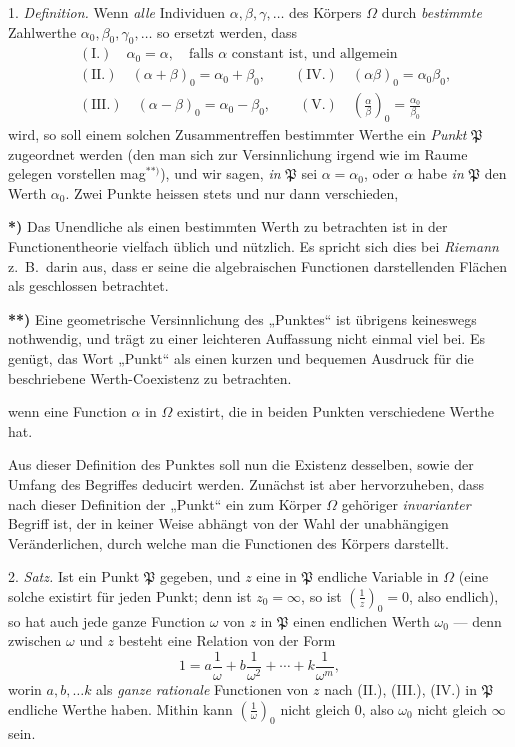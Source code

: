 \documentclass{article}
\begin{document}
1. \emph{Definition.} Wenn \emph{alle} Individuen $\alpha, \beta, \gamma, \ldots$ des Körpers $\Omega$ durch \emph{bestimmte} Zahlwerthe $\alpha_{0}, \beta_{0}, \gamma_{0}, \ldots$ so ersetzt werden, dass
\[ \begin{aligned} &(\text{I.}) \quad \alpha_{0} = \alpha, \quad \text{falls } \alpha \text{ constant ist, und allgemein} \\ &(\text{II.}) \quad (\alpha + \beta)_{0} = \alpha_{0} + \beta_{0}, \qquad (\text{IV.}) \quad (\alpha\beta)_{0} = \alpha_{0}\beta_{0}, \\ &(\text{III.}) \quad (\alpha - \beta)_{0} = \alpha_{0} - \beta_{0}, \qquad (\text{V.}) \quad \left(\frac{\alpha}{\beta}\right)_{0} = \frac{\alpha_{0}}{\beta_{0}} \end{aligned} \]
wird, so soll einem solchen Zusammentreffen bestimmter Werthe ein \emph{Punkt} $\mathfrak{P}$ zugeordnet werden (den man sich zur Versinnlichung irgend wie im Raume gelegen vorstellen mag${}^{**)}$), und wir sagen, \emph{in} $\mathfrak{P}$ sei $\alpha = \alpha_{0}$, oder $\alpha$ habe \emph{in} $\mathfrak{P}$ den Werth $\alpha_{0}$. Zwei Punkte heissen stets und nur dann verschieden,

\textbf{*)} Das Unendliche als einen bestimmten Werth zu betrachten ist in der Functionentheorie vielfach üblich und nützlich. Es spricht sich dies bei \emph{Riemann} z.\ B.\ darin aus, dass er seine die algebraischen Functionen darstellenden Flächen als geschlossen betrachtet.

\textbf{**)} Eine geometrische Versinnlichung des „Punktes“ ist übrigens keineswegs nothwendig, und trägt zu einer leichteren Auffassung nicht einmal viel bei. Es genügt, das Wort „Punkt“ als einen kurzen und bequemen Ausdruck für die beschriebene Werth-Coexistenz zu betrachten.

wenn eine Function $\alpha$ in $\Omega$ existirt, die in beiden Punkten verschiedene Werthe hat.

Aus dieser Definition des Punktes soll nun die Existenz desselben, sowie der Umfang des Begriffes deducirt werden. Zunächst ist aber hervorzuheben, dass nach dieser Definition der „Punkt“ ein zum Körper $\Omega$ gehöriger \emph{invarianter} Begriff ist, der in keiner Weise abhängt von der Wahl der unabhängigen Veränderlichen, durch welche man die Functionen des Körpers darstellt.

2. \emph{Satz.} Ist ein Punkt $\mathfrak{P}$ gegeben, und $z$ eine in $\mathfrak{P}$ endliche Variable in $\Omega$ (eine solche existirt für jeden Punkt; denn ist $z_{0} = \infty$, so ist $\left(\frac{1}{z}\right)_{0} = 0$, also endlich), so hat auch jede ganze Function $\omega$ von $z$ in $\mathfrak{P}$ einen endlichen Werth $\omega_{0}$ --- denn zwischen $\omega$ und $z$ besteht eine Relation von der Form
\[ 1 = a\frac{1}{\omega} + b\frac{1}{\omega^{2}} + \cdots + k\frac{1}{\omega^{m}}, \]
worin $a, b, \ldots k$ als \emph{ganze rationale} Functionen von $z$ nach (II.), (III.), (IV.) in $\mathfrak{P}$ endliche Werthe haben. Mithin kann $\left(\frac{1}{\omega}\right)_{0}$ nicht gleich 0, also $\omega_{0}$ nicht gleich $\infty$ sein.
\end{document}
